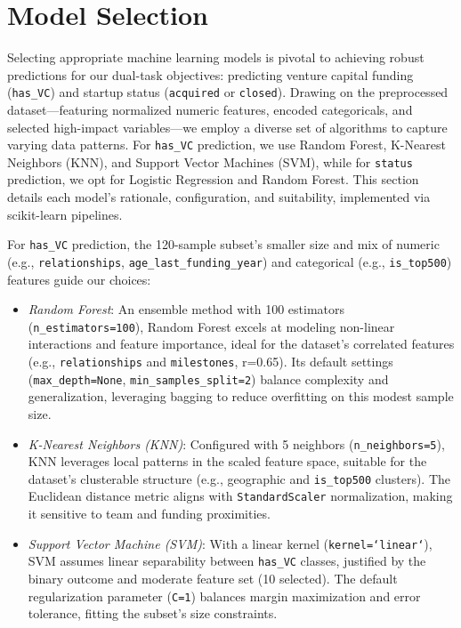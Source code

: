 \documentclass[conference]{IEEEtran}
\begin{document}
\section{Model Selection}
    Selecting appropriate machine learning models is pivotal to achieving robust predictions for our dual-task objectives: predicting venture capital funding (\texttt{has\_VC}) and startup status (\texttt{acquired} or \texttt{closed}). Drawing on the preprocessed dataset—featuring normalized numeric features, encoded categoricals, and selected high-impact variables—we employ a diverse set of algorithms to capture varying data patterns. For \texttt{has\_VC} prediction, we use Random Forest, K-Nearest Neighbors (KNN), and Support Vector Machines (SVM), while for \texttt{status} prediction, we opt for Logistic Regression and Random Forest. This section details each model’s rationale, configuration, and suitability, implemented via scikit-learn pipelines.

    For \texttt{has\_VC} prediction, the 120-sample subset’s smaller size and mix of numeric (e.g., \texttt{relationships}, \texttt{age\_last\_funding\_year}) and categorical (e.g., \texttt{is\_top500}) features guide our choices:
    \begin{itemize}
        \item \textit{Random Forest}: An ensemble method with 100 estimators (\texttt{n\_estimators=100}), Random Forest excels at modeling non-linear interactions and feature importance, ideal for the dataset’s correlated features (e.g., \texttt{relationships} and \texttt{milestones}, r=0.65). Its default settings (\texttt{max\_depth=None}, \texttt{min\_samples\_split=2}) balance complexity and generalization, leveraging bagging to reduce overfitting on this modest sample size.
        \item \textit{K-Nearest Neighbors (KNN)}: Configured with 5 neighbors (\texttt{n\_neighbors=5}), KNN leverages local patterns in the scaled feature space, suitable for the dataset’s clusterable structure (e.g., geographic and \texttt{is\_top500} clusters). The Euclidean distance metric aligns with \texttt{StandardScaler} normalization, making it sensitive to team and funding proximities.
        \item \textit{Support Vector Machine (SVM)}: With a linear kernel (\texttt{kernel=`linear`}), SVM assumes linear separability between \texttt{has\_VC} classes, justified by the binary outcome and moderate feature set (10 selected). The default regularization parameter (\texttt{C=1}) balances margin maximization and error tolerance, fitting the subset’s size constraints.
    \end{itemize}
\end{document}
